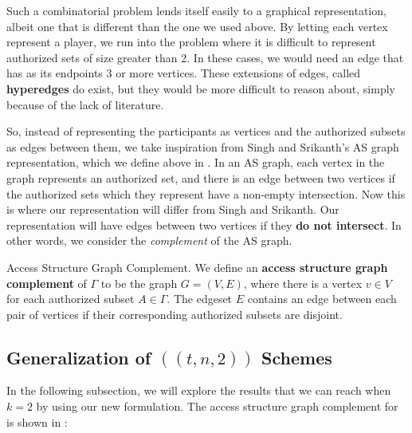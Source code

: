 Such a combinatorial problem lends itself easily to a graphical representation, albeit one that is different than the one we used above. By letting each vertex represent a player, we run into the problem where it is difficult to represent authorized sets of size greater than 2. In these cases, we would need an edge that has as its endpoints 3 or more vertices. These extensions of edges, called \textbf{hyperedges} do exist, but they would be more difficult to reason about, simply because of the lack of literature.

So, instead of representing the participants as vertices and the authorized subsets as edges between them, we take inspiration from Singh and Srikanth's AS graph representation, which we define above in  \cite{singh_assisted_2004}. In an AS graph, each vertex in the graph represents an authorized set, and there is an edge between two vertices if the authorized sets which they represent have a non-empty intersection. Now this is where our representation will differ from Singh and Srikanth. Our representation will have edges between two vertices if they \textbf{do not intersect}. In other words, we consider the \textit{complement} of the AS graph.

\begin{definition}{Access Structure Graph Complement.}
    \label{defn:access-structure-graph-complement}
	We define an \textbf{access structure graph complement} of $\Gamma$ to be the graph $G = (V,E)$, where there is a vertex $v \in V$ for each authorized subset $A \in \Gamma$. The edgeset $E$ contains an edge between each pair of vertices if their corresponding authorized subsets are disjoint.
\end{definition}

\subsection{Generalization of $((t,n,2))$ Schemes}
\label{ssec:generalize-t-n-2}



In the following subsection, we will explore the results that we can reach when $k=2$ by using our new formulation. The access structure graph complement for  is shown in :

